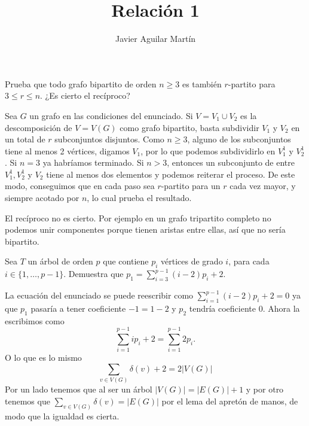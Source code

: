 \documentclass[twoside]{article}
\begin{document}
\title{Relación 1}
\author{Javier Aguilar Martín}
\maketitle


\begin{ejercicio}{1.1}
Prueba que todo grafo bipartito de orden $n \geq 3$ es también $r$-partito para $3\leq r \leq n$. ¿Es
cierto el recíproco?
\end{ejercicio}
\begin{solucion}
Sea $G$ un grafo en las condiciones del enunciado. Si $V=V_1\cup V_2$ es la descomposición de $V=V(G)$ como grafo bipartito, basta subdividir $V_1$ y $V_2$ en un total de $r$ subconjuntos disjuntos. Como $n\geq 3$, alguno de los subconjuntos tiene al menos 2 vértices, digamos $V_1$, por lo que podemos subdividirlo en $V_1^1$ y $V_2^1$. Si $n=3$ ya habríamos terminado. Si $n>3$, entonces un subconjunto de entre $V_1^1, V_2^1$ y $V_2$ tiene al menos dos elementos y podemos reiterar el proceso. De este modo, conseguimos que en cada paso sea $r$-partito para un $r$ cada vez mayor, y siempre acotado por $n$, lo cual prueba el resultado. 

El recíproco no es cierto. Por ejemplo en un grafo tripartito completo no podemos unir componentes porque tienen aristas entre ellas, así que no sería bipartito. 
\end{solucion}

\newpage


\begin{ejercicio}{1.2}
Sea $T$ un árbol de orden $p$ que contiene $p_i$ vértices de grado $i$, para cada $i \in\{1,\dots, p-1\}$. Demuestra que $p_1 =
\sum^{p-1}_{i=3} (i - 2)p_i + 2$.
\end{ejercicio}
\begin{solucion}
La ecuación del enunciado se puede reescribir como $\sum_{i=1}^{p-1}(i-2)p_i+2=0$ ya que $p_1$ pasaría a tener coeficiente $-1=1-2$ y $p_2$ tendría coeficiente 0. Ahora la escribimos como
\[
\sum_{i=1}^{p-1} i p_i + 2 = \sum_{i=1}^{p-1}2p_i.
\]
O lo que es lo mismo
\[
\sum_{v\in V(G)}\delta(v)+2=2|V(G)|
\]
Por un lado tenemos que al ser un árbol $|V(G)|=|E(G)|+1$ y por otro tenemos que $\sum_{v\in V(G)}\delta(v)=|E(G)|$ por el lema del apretón de manos, de modo que la igualdad es cierta. 
\end{solucion}
\end{document}
